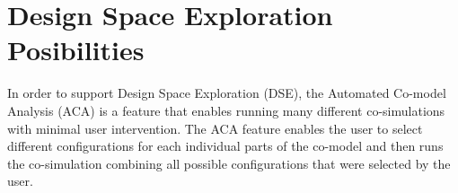 \documentclass{crescendorepchap}
\newcommand{\url}[1]{\texttt{#1}}
\begin{document}







\chapter{Design Space Exploration Posibilities}\label{chap:DSE}

In order to support Design Space Exploration (DSE), the Automated
Co-model Analysis (ACA) is a feature that enables running many different
co-simulations with minimal user intervention. The ACA feature enables
the user to select different configurations for each individual parts of
the co-model and then runs the co-simulation combining all possible
configurations that were selected by the user.
\end{document}
